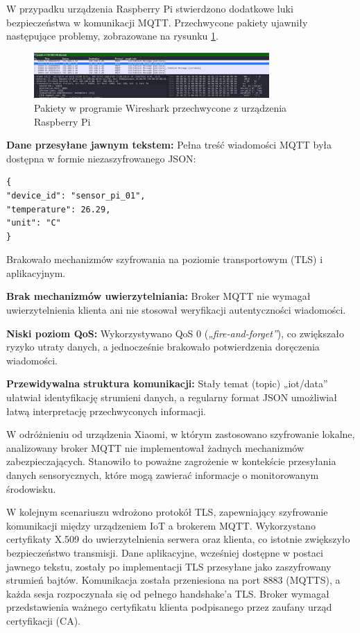 W przypadku urządzenia Raspberry Pi stwierdzono dodatkowe luki bezpieczeństwa w komunikacji MQTT. Przechwycone pakiety ujawniły następujące problemy, zobrazowane na rysunku \ref{fig:Pakiety w programie Wireshark przechwycone z urządzenia Raspberry Pi}.
\begin{figure}[h]
    \centering
    \includegraphics[width=0.8\textwidth]{pictures/sniffwireshark.png}
    \caption{Pakiety w programie Wireshark przechwycone z urządzenia Raspberry Pi}
    \label{fig:Pakiety w programie Wireshark przechwycone z urządzenia Raspberry Pi}
\end{figure}

\textbf{Dane przesyłane jawnym tekstem:}  
Pełna treść wiadomości MQTT była dostępna w formie niezaszyfrowanego JSON:
\begin{verbatim}
{
"device_id": "sensor_pi_01",
"temperature": 26.29,
"unit": "C"
}
\end{verbatim}
Brakowało mechanizmów szyfrowania na poziomie transportowym (TLS) i aplikacyjnym.

\textbf{Brak mechanizmów uwierzytelniania:}  
Broker MQTT nie wymagał uwierzytelnienia klienta ani nie stosował weryfikacji autentyczności wiadomości.

\textbf{Niski poziom QoS:}  
Wykorzystywano QoS 0 (\textit{„fire-and-forget”}), co zwiększało ryzyko utraty danych, a jednocześnie brakowało potwierdzenia doręczenia wiadomości.

\textbf{Przewidywalna struktura komunikacji:}  
Stały temat (topic) „iot/data” ułatwiał identyfikację strumieni danych, a regularny format JSON umożliwiał łatwą interpretację przechwyconych informacji.

W odróżnieniu od urządzenia Xiaomi, w którym zastosowano szyfrowanie lokalne, analizowany broker MQTT nie implementował żadnych mechanizmów zabezpieczających. Stanowiło to poważne zagrożenie w kontekście przesyłania danych sensorycznych, które mogą zawierać informacje o monitorowanym środowisku.

W kolejnym scenariuszu wdrożono protokół TLS, zapewniający szyfrowanie komunikacji między urządzeniem IoT a brokerem MQTT. Wykorzystano certyfikaty X.509 do uwierzytelnienia serwera oraz klienta, co istotnie zwiększyło bezpieczeństwo transmisji. Dane aplikacyjne, wcześniej dostępne w postaci jawnego tekstu, zostały po implementacji TLS przesyłane jako zaszyfrowany strumień bajtów. Komunikacja została przeniesiona na port 8883 (MQTTS), a każda sesja rozpoczynała się od pełnego handshake'a TLS. Broker wymagał przedstawienia ważnego certyfikatu klienta podpisanego przez zaufany urząd certyfikacji (CA).

